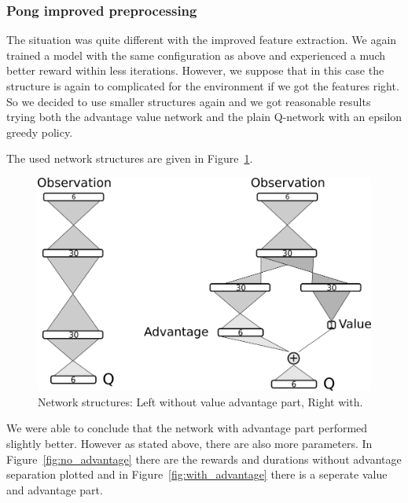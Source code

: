 \documentclass[10pt,a4paper]{article}
\begin{document}
\FloatBarrier
\subsubsection{Pong improved preprocessing}

The situation was quite different with the improved feature extraction. We again trained a model with the same configuration as above and experienced a much better reward within less iterations. 
However, we suppose that in this case the structure is again to complicated for the environment if we got the features right.
So we decided to use smaller structures again and we got reasonable results trying both the advantage value network and the plain Q-network with an epsilon greedy policy.

The used network structures are given in Figure~\ref{fig:pong_comparison}.

\begin{figure}[!ht]
  \centering
  \includegraphics[width=.7\textwidth]{./figures/structure.png}
  \caption{Network structures: Left without value advantage part, Right with.}
  \label{fig:pong_comparison}
\end{figure}

We were able to conclude that the network with advantage part performed slightly better. However as stated above, there are also more parameters. In Figure~\ref{fig:no_advantage} there are the rewards and durations without advantage separation plotted and in Figure~\ref{fig:with_advantage} there is a seperate value and advantage part.
\end{document}

